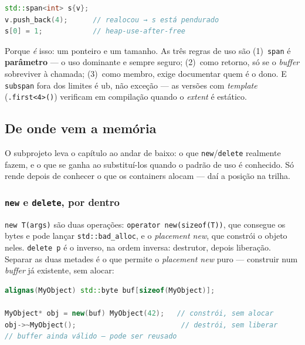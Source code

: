 \begin{armadilha}
\begin{lstlisting}[style=bt, language=C++, frame=none,
                   xleftmargin=0pt, xrightmargin=0pt]
std::span<int> s{v};
v.push_back(4);      // realocou → s está pendurado
s[0] = 1;            // heap-use-after-free
\end{lstlisting}
Porque \emph{é} isso: um ponteiro e um tamanho. As três regras de uso são
(1)~\texttt{span} é \textbf{parâmetro} --- o uso dominante e sempre seguro;
(2)~como retorno, só se o \emph{buffer} sobreviver à chamada; (3)~como membro,
exige documentar quem é o dono. E \texttt{subspan} fora dos limites é
\gls{ub}, não exceção --- as versões com \emph{template}
(\texttt{.first<4>()}) verificam em compilação quando o \emph{extent} é
estático.
\end{armadilha}

\subsection{De onde vem a memória}
\label{sec:memory}

O subprojeto  leva o capítulo ao andar de baixo: o que
\texttt{new}/\texttt{delete} realmente fazem, e o que se ganha ao substituí-los
quando o padrão de uso é conhecido. Só rende depois de conhecer o que os
containers alocam --- daí a posição na trilha.

\subsubsection{\texttt{new} e \texttt{delete}, por dentro}

\texttt{new T(args)} são duas operações: \texttt{operator new(sizeof(T))}, que
consegue os bytes e pode lançar \texttt{std::bad\_alloc}, e o \emph{placement
new}, que constrói o objeto neles. \texttt{delete p} é o inverso, na ordem
inversa: destrutor, depois liberação. Separar as duas metades é o que permite
o \emph{placement new} puro --- construir num \emph{buffer} já existente, sem
alocar:

\begin{lstlisting}[style=bt, language=C++,
    caption={Construção e destruição desacopladas da alocação.}]
alignas(MyObject) std::byte buf[sizeof(MyObject)];

MyObject* obj = new(buf) MyObject(42);   // constrói, sem alocar
obj->~MyObject();                         // destrói, sem liberar
// buffer ainda válido — pode ser reusado
\end{lstlisting}


